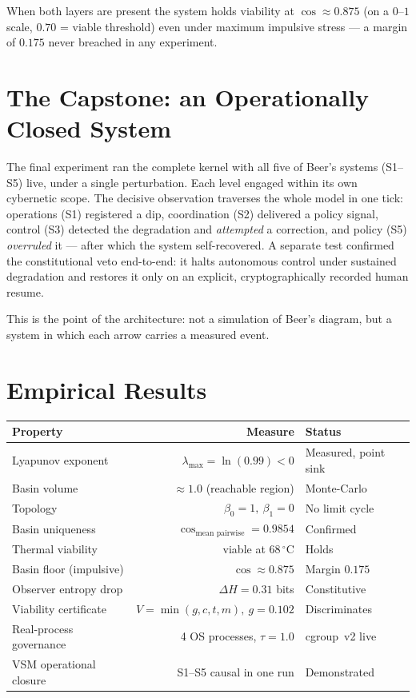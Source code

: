 \documentclass[11pt, a4paper]{article}
\begin{document}
When both layers are present the system holds viability at $\cos \approx 0.875$ (on a
$0$--$1$ scale, $0.70$ = viable threshold) even under maximum impulsive stress --- a
margin of $0.175$ never breached in any experiment.

\section*{The Capstone: an Operationally Closed System}

The final experiment ran the complete kernel with all five of Beer's systems
(S1--S5) live, under a single perturbation. Each level engaged within its own
cybernetic scope. The decisive observation traverses the whole model in one tick:
operations (S1) registered a dip, coordination (S2) delivered a policy signal,
control (S3) detected the degradation and \emph{attempted} a correction, and policy
(S5) \emph{overruled} it --- after which the system self-recovered. A separate test
confirmed the constitutional veto end-to-end: it halts autonomous control under
sustained degradation and restores it only on an explicit, cryptographically
recorded human resume.

This is the point of the architecture: not a simulation of Beer's diagram, but a
system in which each arrow carries a measured event.

\section*{Empirical Results}

\begin{tabular}{lrl}
\textbf{Property} & \textbf{Measure} & \textbf{Status} \\
\hline
Lyapunov exponent        & $\lambda_\text{max} = \ln(0.99) < 0$ & Measured, point sink \\
Basin volume             & $\approx 1.0$ (reachable region)     & Monte-Carlo \\
Topology                 & $\beta_0 = 1,\ \beta_1 = 0$          & No limit cycle \\
Basin uniqueness         & $\cos_\text{mean pairwise} = 0.9854$ & Confirmed \\
Thermal viability        & viable at $68\,^\circ\mathrm{C}$     & Holds \\
Basin floor (impulsive)  & $\cos \approx 0.875$                 & Margin $0.175$ \\
Observer entropy drop    & $\Delta H = 0.31$ bits               & Constitutive \\
Viability certificate    & $V = \min(g,c,t,m),\ g = 0.102$      & Discriminates \\
Real-process governance  & 4 OS processes, $\tau = 1.0$         & cgroup~v2 live \\
VSM operational closure  & S1--S5 causal in one run             & Demonstrated \\
\end{tabular}
\end{document}
